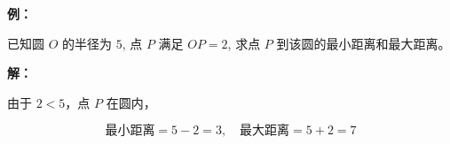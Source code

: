 \begin{examplebox}
\textbf{例：}

已知圆 $O$ 的半径为 $5$,
点 $P$ 满足 $OP=2$,
求点 $P$ 到该圆的最小距离和最大距离。

\textbf{解：}

由于 $2<5$，点 $P$ 在圆内，

\[
\text{最小距离}=5-2=3,
\quad
\text{最大距离}=5+2=7
\]
\end{examplebox}
